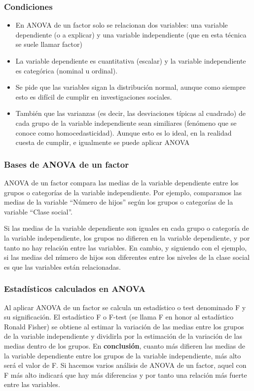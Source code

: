 \documentclass[10pt,letterpaper]{article}
\begin{document}
\subsubsection*{Condiciones}
\begin{itemize}
\item    En ANOVA de un factor solo se relacionan dos variables: una variable dependiente (o a explicar) y una variable independiente (que en esta técnica se suele llamar factor)
\item    La variable dependiente es cuantitativa (escalar) y la variable independiente es categórica (nominal u ordinal).
\item    Se pide que las variables sigan la distribución normal, aunque como siempre esto es difícil de cumplir en investigaciones sociales. 
\item    También que las varianzas (es decir, las desviaciones típicas al cuadrado) de cada grupo de la variable independiente sean similiares (fenómeno que se conoce como homocedasticidad). Aunque esto es lo ideal, en la realidad cuesta de cumplir, e igualmente se puede aplicar ANOVA
\end{itemize}
\subsubsection{Bases de ANOVA de un factor}
ANOVA de un factor compara las medias de la variable dependiente entre los grupos o categorías de la variable independiente. Por ejemplo, comparamos las medias de la variable “Número de hijos” según los grupos o categorías de la variable “Clase social”.

Si las medias de la variable dependiente son iguales en cada grupo o categoría de la variable independiente, los grupos no difieren en la variable dependiente, y por tanto no hay relación entre las variables. En cambio, y siguiendo con el ejemplo, si las medias del número de hijos son diferentes entre los niveles de la clase social es que las variables están relacionadas. 
\subsubsection{Estadísticos calculados en ANOVA}
Al aplicar ANOVA de un factor se calcula un estadístico o test denominado F y su significación. El estadístico F o F-test (se llama F en honor al estadístico Ronald Fisher) se obtiene al estimar la variación de las medias entre los grupos de la variable independiente y dividirla por la estimación de la variación de las medias dentro de los grupos. En \textbf{conclusión}, cuanto más difieren las medias de la variable dependiente entre los grupos de la variable independiente, más alto será el valor de F. Si hacemos varios análisis de ANOVA de un factor, aquel con F más alto indicará que hay más diferencias y por tanto una relación más fuerte entre las variables.
\end{document}
